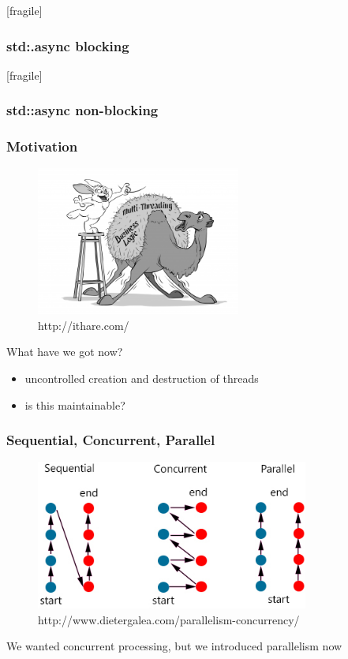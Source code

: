 \begin{frame}{[fragile]}
  \frametitle{std:.async blocking}
\end{frame}%

\begin{frame}{[fragile]}
  \frametitle{std::async non-blocking}
\end{frame}%

\begin{frame}[fragile]
\frametitle{Motivation}
  \begin{figure}[ht]
    \centering
    \includegraphics[width=0.6\textwidth]{img/multi-threading}\\
    {\tiny http://ithare.com/}\\
  \end{figure}
  \vspace{5mm}
  What have we got now?
  \begin{itemize}
    \item uncontrolled creation and destruction of threads
    \item is this maintainable?
  \end{itemize}
\end{frame}

\begin{frame}[fragile]
\frametitle{Sequential, Concurrent, Parallel}
  \begin{figure}[ht]
    \centering
    \includegraphics[width=0.8\textwidth]{img/parallel_sequential_concurrent}\\
    {\tiny http://www.dietergalea.com/parallelism-concurrency/}\\
  \end{figure}
  \vspace{5mm}
  We wanted concurrent processing, but we introduced parallelism now
\end{frame}

